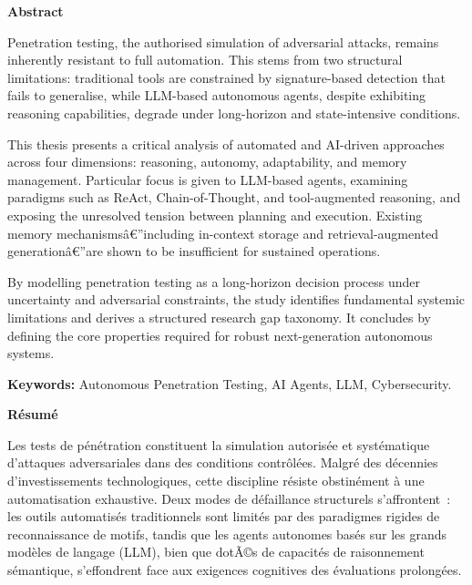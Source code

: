\documentclass[12pt,a4paper,oneside,openany]{book}
\begin{document}
\frontmatter
{}



\begin{center}{\large\bfseries Abstract}\end{center}
\vspace{0.2cm}
\thispagestyle{empty}

Penetration testing, the authorised simulation of adversarial attacks, remains inherently resistant to full automation. This stems from two structural limitations: traditional tools are constrained by signature-based detection that fails to generalise, while LLM-based autonomous agents, despite exhibiting reasoning capabilities, degrade under long-horizon and state-intensive conditions.

This thesis presents a critical analysis of automated and AI-driven approaches across four dimensions: reasoning, autonomy, adaptability, and memory management. Particular focus is given to LLM-based agents, examining paradigms such as ReAct, Chain-of-Thought, and tool-augmented reasoning, and exposing the unresolved tension between planning and execution. Existing memory mechanismsâ€”including in-context storage and retrieval-augmented generationâ€”are shown to be insufficient for sustained operations.

By modelling penetration testing as a long-horizon decision process under uncertainty and adversarial constraints, the study identifies fundamental systemic limitations and derives a structured research gap taxonomy. It concludes by defining the core properties required for robust next-generation autonomous systems.

\noindent\textbf{Keywords:} Autonomous Penetration Testing, AI Agents, LLM, Cybersecurity.
\newpage
\vspace{0.8cm}
\begin{center}{\large\bfseries R{\'e}sum{\'e}}\end{center}
\vspace{0.2cm}
\thispagestyle{empty}

Les tests de p{\'e}n{\'e}tration constituent la simulation autoris{\'e}e et syst{\'e}matique d'attaques adversariales dans des conditions contr{\^o}l{\'e}es. Malgr{\'e} des d{\'e}cennies d'investissements technologiques, cette discipline r{\'e}siste obstin{\'e}ment {\`a} une automatisation exhaustive. Deux modes de d{\'e}faillance structurels s'affrontent~: les outils automatis{\'e}s traditionnels sont limit{\'e}s par des paradigmes rigides de reconnaissance de motifs, tandis que les agents autonomes bas{\'e}s sur les grands mod{\`e}les de langage (LLM), bien que dotÃ©s de capacit{\'e}s de raisonnement s{\'e}mantique, s'effondrent face aux exigences cognitives des {\'{e}}valuations prolong{\'e}es.
\end{document}
